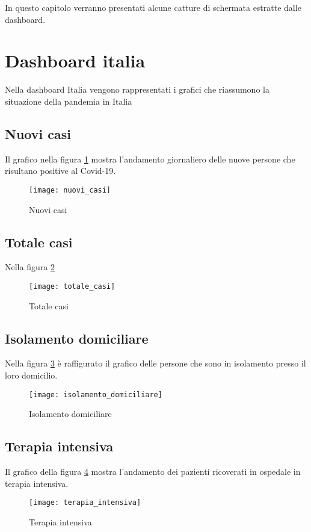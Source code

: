 
\noindent In questo capitolo verranno presentati alcune catture di schermata estratte dalle dashboard.

\section{Dashboard italia}
Nella dashboard Italia vengono rappresentati i grafici che riassumono la situazione della pandemia in Italia

\subsection{Nuovi casi}
Il grafico nella figura \ref{fig:nuovi_casi} mostra l'andamento giornaliero delle nuove persone che risultano positive  al Covid-19.
\begin{figure}[htp]
    \centering
    \texttt{[image: nuovi\_casi]}
    \caption{Nuovi casi}
    \label{fig:nuovi_casi}
\end{figure}

\subsection{Totale casi}
Nella figura \ref{fig:totale_casi}
\begin{figure}[htp]
    \centering
    \texttt{[image: totale\_casi]}
    \caption{Totale casi}
    \label{fig:totale_casi}
\end{figure}

\subsection{Isolamento domiciliare}
Nella figura \ref{fig:isolamento_domiciliare} è raffigurato il grafico delle persone che sono in isolamento presso il loro domicilio.
\begin{figure}[htp]
    \centering
    \texttt{[image: isolamento\_domiciliare]}
    \caption{Isolamento domiciliare}
    \label{fig:isolamento_domiciliare}
\end{figure}

\subsection{Terapia intensiva}
Il grafico della figura \ref{fig:terapia_intensiva} mostra l'andamento dei pazienti ricoverati in ospedale in terapia intensiva.
\begin{figure}[htp]
    \centering
    \texttt{[image: terapia\_intensiva]}
    \caption{Terapia intensiva}
    \label{fig:terapia_intensiva}
\end{figure}

